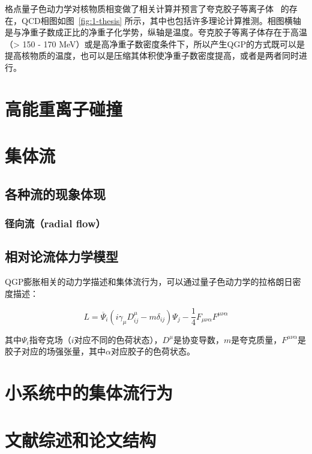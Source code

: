 格点量子色动力学对核物质相变做了相关计算并预言了夸克胶子等离子体 ~\parencite{Shuryak:1978ij, Bohr:1977gj, Zajc:2007ey}的存在，QCD相图如图~\ref{fig:1-thesis}
所示，其中也包括许多理论计算推测。相图横轴是与净重子数成正比的净重子化学势，纵轴是温度。夸克胶子等离子体存在于高温（> 150 - 170 MeV）或是高净重子数密度条件下，所以产生QGP的方式既可以是提高核物质的温度，也可以是压缩其体积使净重子数密度提高，或者是两者同时进行。

\section{高能重离子碰撞}

\section{集体流}

\subsection{各种流的现象体现}

\subsubsection{径向流（radial flow）}

\subsection{相对论流体力学模型}
QGP膨胀相关的动力学描述和集体流行为，可以通过量子色动力学的拉格朗日密度描述：

\begin{equation}
\mathit{L}=\overline{\Psi }_{i}(i\gamma_{\mu }\mathit{D}_{ij}^{\mu }-m\delta_{ij})\Psi_{j}-\frac{1}{4} \mathit{F}_{\mu \nu \alpha } \mathit{F}^{ \mu \nu \alpha}
\end{equation}

其中$\Psi_{i}$指夸克场（$i$对应不同的色荷状态），$\mathit{D}^{\mu}$是协变导数，$m$是夸克质量，$ \mathit{F}^{ \mu \nu \alpha}$是胶子对应的场强张量，其中$\alpha$对应胶子的色荷状态。

\section{小系统中的集体流行为}

\section{文献综述和论文结构}


